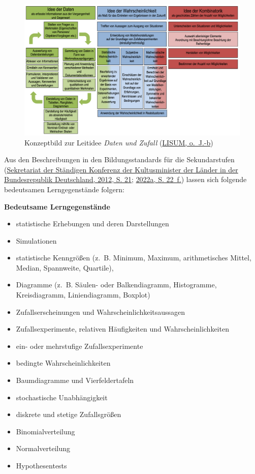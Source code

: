 \documentclass[
]{scrbook}
\providecommand{\tightlist}{%
  \setlength{\itemsep}{0pt}\setlength{\parskip}{0pt}}
\renewenvironment{quote}{
  \list{}{
	\leftmargin0.2cm   %
    \rightmargin\leftmargin
      	\def\FrameCommand
    {%
        {\color{quoteColor}\vrule width 2pt}%
        \hspace{0pt}%
    }%
    \MakeFramed{\advance \hsize -\width \FrameRestore}    \color{quoteColor}
    }
  \item\relax
}
{\endlist\color{black}\endMakeFramed}
\theoremstyle{definition}
\theoremstyle{definition}
\theoremstyle{definition}
\theoremstyle{definition}
\theoremstyle{remark}
\begin{document}
\begin{figure}

{\centering \includegraphics[width=0.9\linewidth]{pictures/14-KonzeptDatenZufall} 

}

\caption{Konzeptbild zur Leitidee \emph{Daten und Zufall} (\protect\hyperlink{ref-LISUMa}{LISUM, o.~J.-b})}\label{fig:KonzeptDatenZufall}
\end{figure}

Aus den Beschreibungen in den Bildungsstandards für die Sekundarstufen (\protect\hyperlink{ref-KMK:2012}{Sekretariat der Ständigen Konferenz der Kultusminister der Länder in der Bundesrepublik Deutschland, 2012, S. 21}; \protect\hyperlink{ref-SekretariatderStandigenKonferenzderKultusministerderLanderinderBundesrepublikDeutschland2022}{2022a, S. 22~f.}) lassen sich folgende bedeutsamen Lerngegenstände folgern:

\begin{quote}
\textbf{Bedeutsame Lerngegenstände}

\begin{itemize}
\tightlist
\item
  statistische Erhebungen und deren Darstellungen
\item
  Simulationen
\item
  statistische Kenngrößen (z.~B. Minimum, Maximum, arithmetisches Mittel, Median, Spannweite, Quartile),
\item
  Diagramme (z.~B. Säulen- oder Balkendiagramm, Histogramme, Kreisdiagramm, Liniendiagramm, Boxplot)
\item
  Zufallserscheinungen und Wahrscheinlichkeitsaussagen
\item
  Zufallsexperimente, relativen Häufigkeiten und Wahrscheinlichkeiten
\item
  ein- oder mehrstufige Zufallsexperimente
\item
  bedingte Wahrscheinlichkeiten
\item
  Baumdiagramme und Vierfeldertafeln
\item
  stochastische Unabhängigkeit
\item
  diskrete und stetige Zufallsgrößen
\item
  Binomialverteilung
\item
  Normalverteilung
\item
  Hypothesentests
\end{itemize}
\end{quote}
\end{document}
